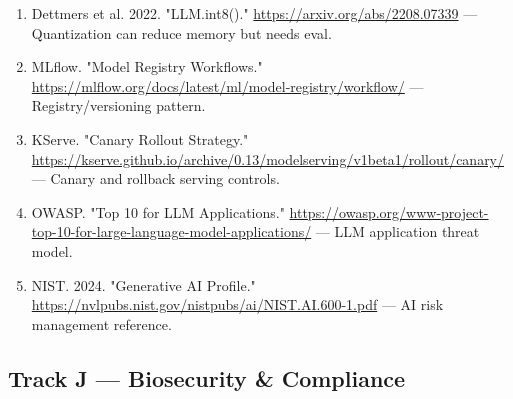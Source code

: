 \documentclass[11pt]{report}
\begin{document}
\begin{enumerate}
\item Dettmers et al. 2022. "LLM.int8()." \url{https://arxiv.org/abs/2208.07339} — Quantization can reduce memory but needs eval.
\item MLflow. "Model Registry Workflows." \url{https://mlflow.org/docs/latest/ml/model-registry/workflow/} — Registry/versioning pattern.
\item KServe. "Canary Rollout Strategy." \url{https://kserve.github.io/archive/0.13/modelserving/v1beta1/rollout/canary/} — Canary and rollback serving controls.
\item OWASP. "Top 10 for LLM Applications." \url{https://owasp.org/www-project-top-10-for-large-language-model-applications/} — LLM application threat model.
\item NIST. 2024. "Generative AI Profile." \url{https://nvlpubs.nist.gov/nistpubs/ai/NIST.AI.600-1.pdf} — AI risk management reference.
\end{enumerate}

\subsection{Track J — Biosecurity \& Compliance}
\end{document}
